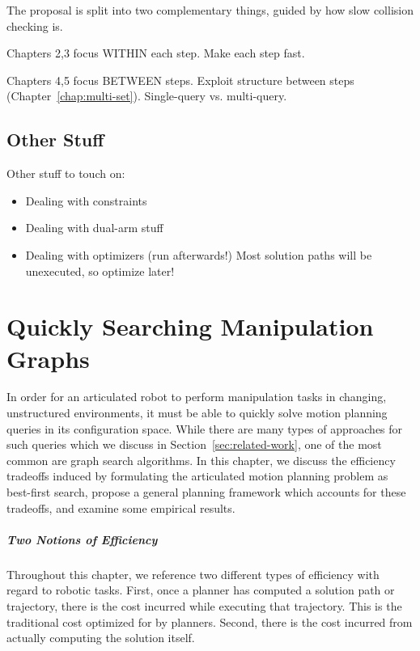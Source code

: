 \documentclass{report}
\begin{document}
The proposal is split into two complementary things,
guided by how slow collision checking is.

Chapters 2,3 focus WITHIN each step.
Make each step fast.

Chapters 4,5 focus BETWEEN steps.
Exploit structure between steps (Chapter~\ref{chap:multi-set}).
Single-query vs. multi-query.

\section{Other Stuff}

Other stuff to touch on:
\begin{itemize}
\item Dealing with constraints
\item Dealing with dual-arm stuff
\item Dealing with optimizers (run afterwards!)
   Most solution paths will be unexecuted, so optimize later!
\end{itemize}


\newpage
\chapter{Quickly Searching Manipulation Graphs}
\label{chap:inflate}

In order for an articulated robot to perform manipulation tasks
in changing, unstructured environments,
it must be able to quickly solve motion planning queries in its
configuration space.
While there are many types of approaches for such queries
which we discuss in Section~\ref{sec:related-work},
one of the most common are graph search algorithms.
In this chapter,
we discuss the efficiency tradeoffs induced by formulating
the articulated motion planning problem as best-first search,
propose a general planning framework which accounts for these tradeoffs,
and examine some empirical results.

\paragraph{Two Notions of Efficiency}

Throughout this chapter,
we reference two different types of efficiency
with regard to robotic tasks.
First, once a planner has computed a solution path or trajectory,
there is the cost incurred while executing that trajectory.
This is the traditional cost optimized for by planners.
Second, there is the cost incurred from actually computing the solution
itself.
\end{document}
